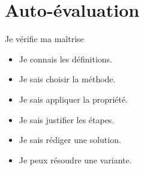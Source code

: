 \documentclass[11pt,a4paper]{article}
\begin{document}
\section{Auto-évaluation}

\begin{cadregris}{Je vérifie ma maîtrise}
\begin{itemize}
    \item[$\square$] Je connais les définitions.
    \item[$\square$] Je sais choisir la méthode.
    \item[$\square$] Je sais appliquer la propriété.
    \item[$\square$] Je sais justifier les étapes.
    \item[$\square$] Je sais rédiger une solution.
    \item[$\square$] Je peux résoudre une variante.
\end{itemize}
\end{cadregris}
\end{document}
